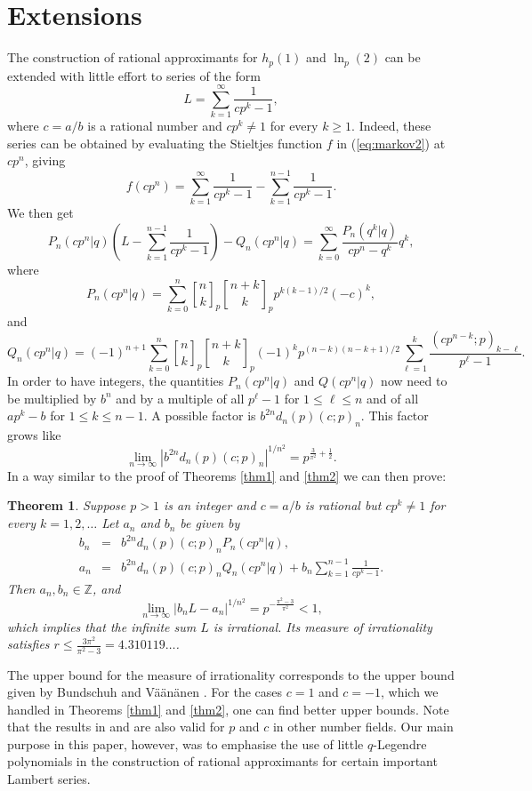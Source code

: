 \documentclass[12pt]{article}
\DeclareRobustCommand{\qbinom}{\genfrac[]{0pt}{}}
\newtheorem{theorem}{Theorem}
\begin{document}
\section{Extensions}           
The construction of rational approximants for $h_p(1)$ and $\ln_p(2)$
can be extended with little effort to series of the form
\[    L = \sum_{k=1}^\infty \frac{1}{c p^k-1}, \]
where $c = a/b$ is a rational number and $c p^k \neq 1$ for every $k \geq 1$.
Indeed, these series can be obtained by evaluating the Stieltjes
function $f$ in (\ref{eq:markov2}) at $c p^n$, giving
\[  f(cp^n) = \sum_{k=1}^\infty \frac{1}{cp^k-1} -
   \sum_{k=1}^{n-1} \frac{1}{cp^k-1}. \]
We then get
\[   P_n(cp^n|q) \left( L - \sum_{k=1}^{n-1} \frac{1}{cp^k-1}
  \right) - Q_n(cp^n|q) =  \sum_{k=0}^\infty 
  \frac{P_n(q^k|q)}{cp^n-q^k} q^k, \]
where
\[  P_n(cp^n|q) =   \sum_{k=0}^n \qbinom{n}{k}_p \qbinom{n+k}{k}_p
    p^{k(k-1)/2} (-c)^k , \]
and
\[ Q_n(cp^n|q) = (-1)^{n+1} \sum_{k=0}^n \qbinom{n}{k}_p \qbinom{n+k}{k}_p (-1)^k
                  p^{(n-k)(n-k+1)/2} \sum_{\ell=1}^{k} \frac{(cp^{n-k};p)_{k-\ell}}{p^\ell-1} . \] 
 In order to have integers,
the quantities $P_n(cp^n|q)$ and $Q(cp^n|q)$ now need to be multiplied by 
$b^n$ and by a multiple of all $p^\ell-1$ for $1\leq \ell \leq n$ and of
all $ap^k-b$ for $1\leq k \leq n-1$. A possible factor is
$b^{2n} d_n(p) (c;p)_n$. This factor grows like
\[  \lim_{n \to \infty}  |b^{2n} d_n(p) (c;p)_n|^{1/n^2} = p^{\frac{3}{\pi^2} + \frac12}. \]  
In a way similar to the proof of Theorems \ref{thm1} and \ref{thm2} we can then prove:

\begin{theorem}  \label{thm3}
Suppose $p>1$ is an integer and $c = a/b$ is rational but $cp^k \neq 1$ for every $k=1,2,\ldots$
Let $a_n$ and $b_n$ be given by 
\begin{eqnarray}
    b_n & = & b^{2n} d_n(p) (c;p)_n P_n(cp^n|q), \\
    a_n & = & b^{2n} d_n(p) (c;p)_n Q_n(cp^n|q) +b_n \sum_{k=1}^{n-1} \frac{1}{cp^k-1}.
\end{eqnarray}
Then
$a_n, b_n \in \mathbb{Z}$, and
\[  \lim_{n \to \infty} |b_n L - a_n |^{1/n^2}
 = p^{-\frac{\pi^2-3}{\pi^2}} < 1, \] 
which implies that the infinite sum $L$ is irrational. Its measure of irrationality
satisfies $r \leq \frac{3\pi^2}{\pi^2-3} = 4.310119\ldots$.
\end{theorem}

The upper bound for the measure of irrationality corresponds to the upper bound
given by Bundschuh and V\"a\"an\"anen
 \cite[p.~178]{BV}. For the cases $c=1$ and $c=-1$, which we handled in
Theorems \ref{thm1} and \ref{thm2}, one can find better upper bounds.
Note that the results in \cite{BV} and \cite{MV} are also valid for
$p$ and $c$ in other number fields. Our main purpose in this paper, however,
was to emphasise the use of little $q$-Legendre polynomials in
the construction of rational approximants for certain important Lambert
series.
\end{document}
